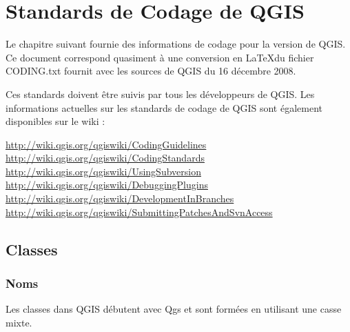 
\section{Standards de Codage de QGIS}


Le chapitre suivant fournie des informations de codage pour la version \CURRENT de QGIS.
Ce document correspond quasiment à une conversion en \LaTeX du fichier CODING.txt fournit 
avec les sources de QGIS du 16 décembre 2008.

Ces standards doivent être suivis par tous les développeurs de QGIS. Les informations actuelles
sur les standards de codage de QGIS sont également disponibles sur le wiki :

\url{http://wiki.qgis.org/qgiswiki/CodingGuidelines} \\
\url{http://wiki.qgis.org/qgiswiki/CodingStandards} \\
\url{http://wiki.qgis.org/qgiswiki/UsingSubversion} \\
\url{http://wiki.qgis.org/qgiswiki/DebuggingPlugins} \\
\url{http://wiki.qgis.org/qgiswiki/DevelopmentInBranches} \\
\url{http://wiki.qgis.org/qgiswiki/SubmittingPatchesAndSvnAccess} \\

\subsection{Classes}
\subsubsection{Noms}
Les classes dans QGIS débutent avec Qgs et sont formées en utilisant une casse mixte.

